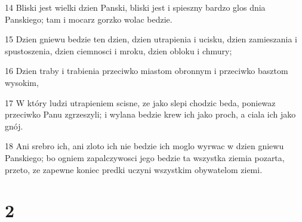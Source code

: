 \par 14 Bliski jest wielki dzien Panski, bliski jest i spieszny bardzo glos dnia Panskiego; tam i mocarz gorzko wolac bedzie.
\par 15 Dzien gniewu bedzie ten dzien, dzien utrapienia i ucisku, dzien zamieszania i spustoszenia, dzien ciemnosci i mroku, dzien obloku i chmury;
\par 16 Dzien traby i trabienia przeciwko miastom obronnym i przeciwko basztom wysokim,
\par 17 W który ludzi utrapieniem scisne, ze jako slepi chodzic beda, poniewaz przeciwko Panu zgrzeszyli; i wylana bedzie krew ich jako proch, a ciala ich jako gnój.
\par 18 Ani srebro ich, ani zloto ich nie bedzie ich moglo wyrwac w dzien gniewu Panskiego; bo ogniem zapalczywosci jego bedzie ta wszystka ziemia pozarta, przeto, ze zapewne koniec predki uczyni wszystkim obywatelom ziemi.

\chapter{2}

